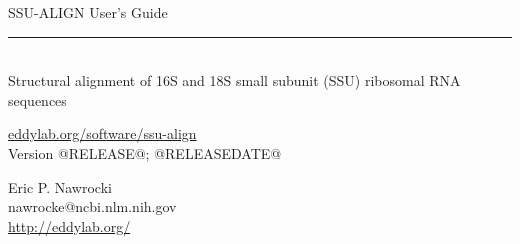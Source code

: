 \begin{titlepage}
{\Large

\vspace*{\fill}

\noindent
{\Huge \textsf{SSU-ALIGN User's Guide}} \\ 
\rule[2pt]{\textwidth}{1pt} \\
\hspace*{\fill} {\large \textsf{Structural alignment of 16S and 18S small subunit
    (SSU) ribosomal RNA sequences}\\}

\vspace*{\fill}

\begin{center}
\url{eddylab.org/software/ssu-align}\\
Version @RELEASE@; @RELEASEDATE@ \\ 

\vspace*{\fill}

Eric P. Nawrocki\\
nawrocke@ncbi.nlm.nih.gov\\
\url{http://eddylab.org/}
\end{center}

\vspace*{\fill}

}
\end{titlepage}
